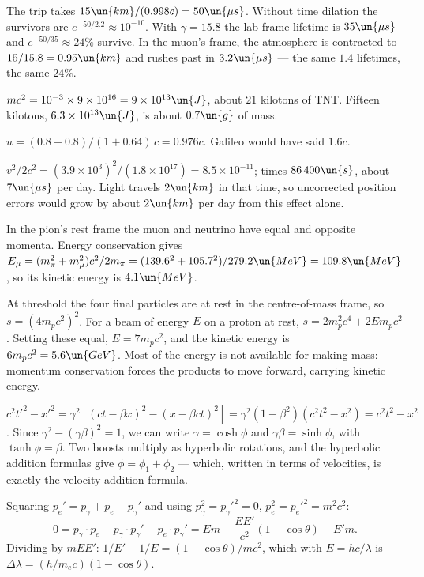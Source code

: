 
 The trip takes $15\un{km}/(0.998c) = 50\un{\mu s}$. Without time dilation the survivors are $e^{-50/2.2}\approx10^{-10}$. With $\gamma = 15.8$ the lab-frame lifetime is $35\un{\mu s}$ and $e^{-50/35}\approx24\%$ survive. In the muon's frame, the atmosphere is contracted to $15/15.8 = 0.95\un{km}$ and rushes past in $3.2\un{\mu s}$ --- the same $1.4$ lifetimes, the same $24\%$.

 $mc^2 = 10^{-3}\times9\times10^{16} = 9\times10^{13}\un{J}$, about $21$ kilotons of TNT. Fifteen kilotons, $6.3\times10^{13}\un{J}$, is about $0.7\un{g}$ of mass.

 $u = (0.8+0.8)/(1+0.64)\,c = 0.976c$. Galileo would have said $1.6c$.

 $v^2/2c^2 = (3.9\times10^3)^2/(1.8\times10^{17}) = 8.5\times10^{-11}$; times $86\,400\un{s}$, about $7\un{\mu s}$ per day. Light travels $2\un{km}$ in that time, so uncorrected position errors would grow by about $2\un{km}$ per day from this effect alone.

 In the pion's rest frame the muon and neutrino have equal and opposite momenta. Energy conservation gives $E_\mu = (m_\pi^2+m_\mu^2)c^2/2m_\pi = (139.6^2+105.7^2)/279.2\un{MeV} = 109.8\un{MeV}$, so its kinetic energy is $4.1\un{MeV}$.

 At threshold the four final particles are at rest in the centre-of-mass frame, so $s = (4m_pc^2)^2$. For a beam of energy $E$ on a proton at rest, $s = 2m_p^2c^4 + 2Em_pc^2$. Setting these equal, $E = 7m_pc^2$, and the kinetic energy is $6m_pc^2 = 5.6\un{GeV}$. Most of the energy is not available for making mass: momentum conservation forces the products to move forward, carrying kinetic energy.

 $c^2t'^2-x'^2 = \gamma^2[(ct-\beta x)^2 - (x-\beta ct)^2] = \gamma^2(1-\beta^2)(c^2t^2-x^2) = c^2t^2-x^2$. Since $\gamma^2-(\gamma\beta)^2 = 1$, we can write $\gamma = \cosh\phi$ and $\gamma\beta = \sinh\phi$, with $\tanh\phi = \beta$. Two boosts multiply as hyperbolic rotations, and the hyperbolic addition formulas give $\phi = \phi_1+\phi_2$ --- which, written in terms of velocities, is exactly the velocity-addition formula.

 Squaring $p_e' = p_\gamma + p_e - p_\gamma'$ and using $p_\gamma^2 = p_\gamma'^2 = 0$, $p_e^2 = p_e'^2 = m^2c^2$:
\[
  0 = p_\gamma\cdot p_e - p_\gamma\cdot p_\gamma' - p_e\cdot p_\gamma' = Em - \frac{EE'}{c^2}(1-\cos\theta) - E'm .
\]
Dividing by $mEE'$: $1/E' - 1/E = (1-\cos\theta)/mc^2$, which with $E = hc/\lambda$ is $\Delta\lambda = (h/m_ec)(1-\cos\theta)$.

